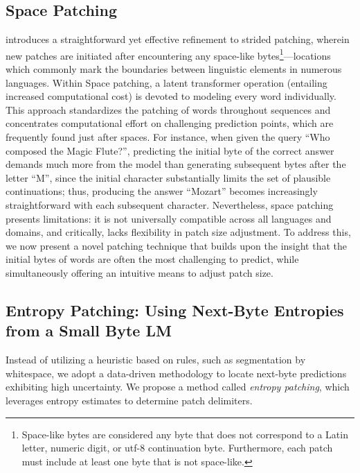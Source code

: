 \subsection{Space Patching}
\label{section:white-patch}

\citet{slagle2024spacebyte} introduces a straightforward yet effective refinement to strided patching, wherein new patches are initiated after encountering any space-like bytes\footnote{
    Space-like bytes are considered any byte that does not correspond to a Latin letter, numeric digit, or utf-8 continuation byte. Furthermore, each patch must include at least one byte that is not space-like. }—locations which commonly mark the boundaries between linguistic elements in numerous languages. Within Space patching, a latent transformer operation (entailing increased computational cost) is devoted to modeling every word individually. This approach standardizes the patching of words throughout sequences and concentrates computational effort on challenging prediction points, which are frequently found just after spaces. For instance, when given the query ``Who composed the Magic Flute?\uline{\hspace{.6em}}'', predicting the initial byte of the correct answer demands much more from the model than generating subsequent bytes after the letter ``M'', since the initial character substantially limits the set of plausible continuations; thus, producing the answer ``Mozart'' becomes increasingly straightforward with each subsequent character. Nevertheless, space patching presents limitations: it is not universally compatible across all languages and domains, and critically, lacks flexibility in patch size adjustment. To address this, we now present a novel patching technique that builds upon the insight that the initial bytes of words are often the most challenging to predict, while simultaneously offering an intuitive means to adjust patch size.

\subsection{Entropy Patching: Using Next-Byte Entropies from a Small Byte LM}
\label{section:dyn-patch}

Instead of utilizing a heuristic based on rules, such as segmentation by whitespace, we adopt a data-driven methodology to locate next-byte predictions exhibiting high uncertainty. We propose a method called \textit{entropy patching}, which leverages entropy estimates to determine patch delimiters.

